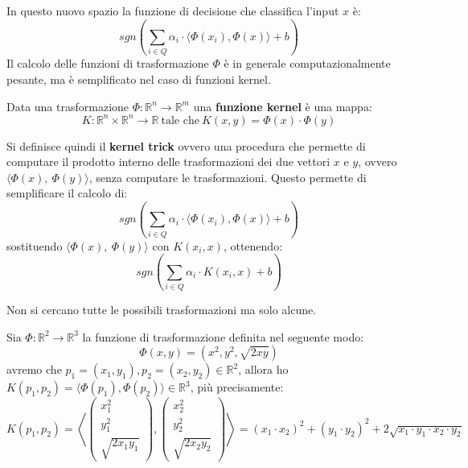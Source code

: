 In questo nuovo spazio la funzione di decisione che classifica l'input $x$ è:
\begin{equation}
    sgn\left(\sum_{i \in Q} \alpha_i \cdot \langle \Phi(x_i), \Phi(x)\rangle + b
    \right)
\end{equation}
Il calcolo delle funzioni di trasformazione $\Phi$ è in generale computazionalmente
pesante, ma è semplificato nel caso di funzioni kernel.
\begin{definizione}
    Data una trasformazione $\Phi: \mathbb{R}^n \to \mathbb{R}^m$ una
    \textbf{funzione kernel} è una mappa:
    \begin{equation}
        K: \mathbb{R}^n \times \mathbb{R}^n \to \mathbb{R} \ \text{tale che} \
        K(x, y) = \Phi(x) \cdot \Phi(y)
    \end{equation}
\end{definizione}
\begin{definizione}
    Si definisce quindi il \textbf{kernel trick} ovvero una procedura che permette
    di computare il prodotto interno delle trasformazioni dei due vettori $x$ e
    $y$, ovvero $\langle\Phi(x), \ \Phi(y)\rangle$, senza computare le
    trasformazioni. Questo permette di semplificare il calcolo di:
    \begin{equation}
        sgn\left(\sum_{i \in Q} \alpha_i \cdot \langle \Phi(x_i), \Phi(x) \rangle
        + b \right)
    \end{equation}
    sostituendo $\langle\Phi(x), \ \Phi(y)\rangle$ con $K(x_i, x)$, ottenendo:
    \begin{equation}
        sgn\left(\sum_{i \in Q} \alpha_i \cdot K(x_i, x) + b \right)
    \end{equation}
\end{definizione}
\begin{nota}
    Non si cercano tutte le possibili trasformazioni ma solo alcune.
\end{nota}
\begin{esempio}
    Sia $\Phi:\mathbb{R}^2\rightarrow\mathbb{R}^3$ la funzione di trasformazione
    definita nel seguente modo:
    \begin{equation}
        \Phi(x,y) =(x^2,y^2,\sqrt{2xy})
    \end{equation}
    avremo che $p_1 = (x_1, y_1), p_2 = (x_2, y_2) \in \mathbb{R}^2$, allora ho
    $K(p_1, p_2) = \langle \Phi(p_1), \Phi(p_2) \rangle \in\mathbb{R}^3$,
    più precisamente:
    $$K(p_1,p_2) = \left\langle\left(\begin{array}{c}
                x_1^2 \\
                y_1^2 \\
                \sqrt{2x_1y_1}
            \end{array}\right),\left(\begin{array}{c}
                x_2^2 \\
                y_2^2 \\
                \sqrt{2x_2y_2}
            \end{array}\right)\right\rangle = (x_1 \cdot x_2)^2 + (y_1 \cdot
        y_2)^2 + 2 \sqrt{x_1 \cdot y_1 \cdot x_2 \cdot y_2}$$
\end{esempio}
